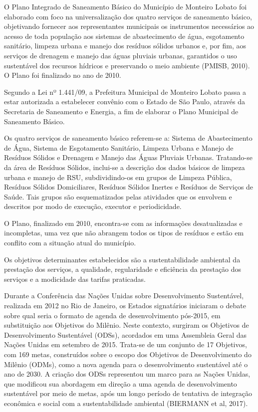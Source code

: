 	O Plano Integrado de Saneamento Básico do Município de Monteiro Lobato foi elaborado com foco na universalização dos quatro serviços de saneamento básico, objetivando fornecer aos representantes municipais os instrumentos necessários ao acesso de toda população aos sistemas de abastecimento de água, esgotamento sanitário, limpeza urbana e manejo dos resíduos sólidos urbanos e, por fim, aos serviços de drenagem e manejo das águas pluviais urbanas, garantidos o uso sustentável dos recursos hídricos e preservando o meio ambiente (PMISB, 2010). O Plano foi finalizado no ano de 2010.
	
	Segundo a Lei nº 1.441/09, a Prefeitura Municipal de Monteiro Lobato passa a estar autorizada a estabelecer convênio com o Estado de São Paulo, através da Secretaria de Saneamento e Energia, a fim de elaborar o Plano Municipal de Saneamento Básico.
	
	Os quatro serviços de saneamento básico referem-se a: Sistema de Abastecimento de Água, Sistema de Esgotamento Sanitário, Limpeza Urbana e Manejo de Resíduos Sólidos e Drenagem e Manejo das Águas Pluviais Urbanas. Tratando-se da área de Resíduos Sólidos, inclui-se a descrição dos dados básicos de limpeza urbana e manejo de RSU, subdividindo-os em grupos de Limpeza Pública, Resíduos Sólidos Domiciliares, Resíduos Sólidos Inertes e Resíduos de Serviços de Saúde. Tais grupos são esquematizados pelas atividades que os envolvem e descritos por modo de execução, executor e periodicidade.
	
	O Plano, finalizado em 2010, encontra-se com as informações desatualizadas e incompletas, uma vez que não abrangem todos os tipos de resíduos e estão em conflito com a situação atual do município.
	
	Os objetivos determinantes estabelecidos são a sustentabilidade ambiental da prestação dos serviços, a qualidade, regularidade e eficiência da prestação dos serviços e a modicidade das tarifas praticadas.
	
	Durante a Conferência das Nações Unidas sobre Desenvolvimento Sustentável, realizada em 2012 no Rio de Janeiro, os Estados signatários iniciaram o debate sobre qual seria o formato de agenda de desenvolvimento pós-2015, em substituição aos Objetivos do Milênio. Neste contexto, surgiram os Objetivos de Desenvolvimento Sustentável (ODSs), acordados em uma Assembleia Geral das Nações Unidas em setembro de 2015. Trata-se de um conjunto de 17 Objetivos, com 169 metas, construídos sobre o escopo dos Objetivos de Desenvolvimento do Milênio (ODMs), como a nova agenda para o desenvolvimento sustentável até o ano de 2030. A criação dos ODSs representou um marco para as Nações Unidas, que modificou sua abordagem em direção a uma agenda de desenvolvimento sustentável por meio de metas, após um longo período de tentativa de integração econômica e social com a sustentabilidade ambiental (BIERMANN et al, 2017).
	

